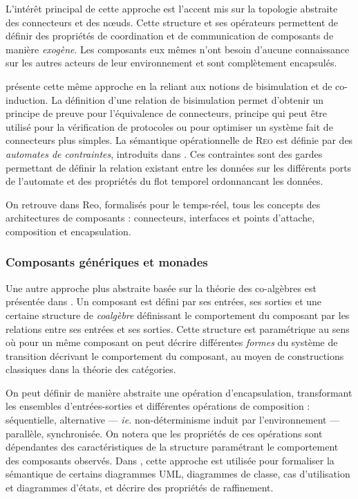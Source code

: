 L'int\'er\^et principal de cette approche est l'accent mis sur la
topologie abstraite des connecteurs et des n\oe uds. Cette structure
et ses op\'erateurs permettent de
d\'efinir des propri\'et\'es de coordination et de communication de
composants de mani\`ere \emph{exog\`ene}. Les composants eux m\^emes
n'ont besoin d'aucune connaissance sur les autres acteurs de leur
environnement et sont compl\`etement encapsul\'es.

\cite{coind-calc-component} pr\'esente cette m\^eme approche en la
reliant aux notions de bisimulation et de co-induction. La d\'efinition d'une relation de bisimulation permet
d'obtenir un principe de preuve pour l'\'equivalence de connecteurs,
principe qui peut \^etre utilis\'e pour la v\'erification de
protocoles ou pour optimiser un syst\`eme fait de connecteurs plus
simples. La s\'emantique op\'erationnelle de \textsc{Reo} est d\'efinie par
des \emph{automates de contraintes}, introduits dans
\cite{constraint-automata}. Ces contraintes sont des  gardes permettant de d\'efinir la relation existant entre les
  donn\'ees sur les diff\'erents ports de l'automate et des
  propri\'et\'es du flot temporel ordonnancant les donn\'ees.

On retrouve dans \textsf{Reo}, formalis\'es pour le temps-r\'eel,
tous les concepts des architectures  de composants : connecteurs,
interfaces et points  d'attache, composition et encapsulation. 

\subsubsection{Composants g\'en\'eriques et monades}

Une autre approche plus abstraite bas\'ee sur la th\'eorie des
co-alg\`ebres est pr\'esent\'ee dans
\cite{coalg-comp-proc,gen-comp,coalg-calc-comp}. Un composant est d\'efini par ses
entr\'ees, ses sorties et une certaine structure de
\emph{coalg\`ebre} d\'efinissant le comportement du composant par
les relations entre ses entr\'ees et ses sorties. Cette structure est param\'etrique au
sens o\`u pour un m\^eme composant on peut d\'ecrire diff\'erentes \emph{formes} du
syst\`eme de transition d\'ecrivant le comportement du composant,  au moyen de constructions
classiques dans la th\'eorie des cat\'egories\cite{maclane-categories}.

On peut d\'efinir de mani\`ere abstraite
une op\'eration d'encapsulation, transformant les ensembles
d'entr\'ees-sorties et diff\'erentes op\'erations de composition :
s\'equentielle, alternative  --- \emph{ie.} non-d\'eterminisme induit par
l'environnement ---  parall\`ele, synchronis\'ee. On notera que les
propri\'et\'es de ces op\'erations sont d\'ependantes des
caract\'eristiques de la structure param\'etrant le
comportement des composants observ\'es. Dans \cite{meng-coalg-uml},
cette approche est utilis\'ee pour formaliser la s\'emantique de
certains diagrammes \textsf{UML}, diagrammes de classe, cas d'utilisation et
diagrammes d'\'etats, et d\'ecrire des propri\'et\'es de
raffinement.

